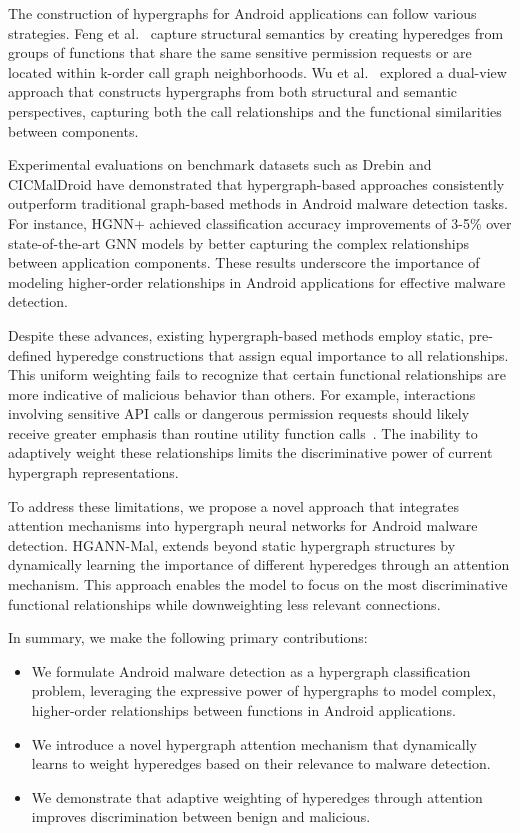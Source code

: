 \documentclass[runningheads]{llncs}
\begin{document}
The construction of hypergraphs for Android applications can follow various strategies. Feng et al.~\cite{zhang2023} capture structural semantics by creating hyperedges from groups of functions that share the same sensitive permission requests or are located within k-order call graph neighborhoods. Wu et al.~\cite{wu2021} explored a dual-view approach that constructs hypergraphs from both structural and semantic perspectives, capturing both the call relationships and the functional similarities between components.

Experimental evaluations on benchmark datasets such as Drebin \cite{arp2014} and CICMalDroid \cite{mahdavifar2020dynamic,mahdavifar2022effective} have demonstrated that hypergraph-based approaches consistently outperform traditional graph-based methods in Android malware detection tasks. For instance, HGNN+ \cite{gao2023} achieved classification accuracy improvements of 3-5\% over state-of-the-art GNN models by better capturing the complex relationships between application components. These results underscore the importance of modeling higher-order relationships in Android applications for effective malware detection.

Despite these advances, existing hypergraph-based methods employ static, pre-defined hyperedge constructions that assign equal importance to all relationships. This uniform weighting fails to recognize that certain functional relationships are more indicative of malicious behavior than others. For example, interactions involving sensitive API calls or dangerous permission requests should likely receive greater emphasis than routine utility function calls~\cite{narayanan2018}. The inability to adaptively weight these relationships limits the discriminative power of current hypergraph representations.

To address these limitations, we propose a novel approach that integrates attention mechanisms \cite{bai2021}  into hypergraph neural networks for Android malware detection. HGANN-Mal, extends beyond static hypergraph structures by dynamically learning the importance of different hyperedges through an attention mechanism. This approach enables the model to focus on the most discriminative functional relationships while downweighting less relevant connections.

\medskip \noindent In summary, we make the following primary contributions:

\begin{itemize}
\item We formulate Android malware detection as a hypergraph classification problem, leveraging the expressive power of hypergraphs to model complex, higher-order relationships between functions in Android applications.

\item We introduce a novel hypergraph attention mechanism that dynamically learns to weight hyperedges based on their relevance to malware detection.

\item We demonstrate that adaptive weighting of hyperedges through attention improves discrimination between benign and malicious.

\end{itemize}
\end{document}
